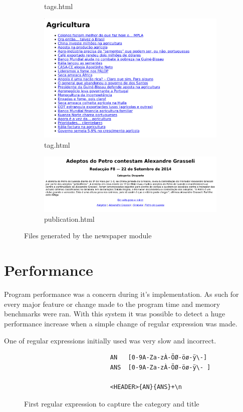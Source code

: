 \documentclass[a4paper]{article}
\begin{document}
\begin{figure}[H]
\begin{subfigure}{0.45\textwidth}
        \caption{tags.html}
    \end{subfigure}
    \begin{subfigure}{0.45\textwidth}
        \includegraphics[width=\textwidth]{./tag_print.png}
        \caption{tag.html}
    \end{subfigure}
    \begin{subfigure}{0.54\textwidth}
        \includegraphics[width=\textwidth]{./publication_print.png}
        \caption{publication.html}
    \end{subfigure}
    \caption{Files generated by the newspaper module}
\end{figure}

\section{Performance}

Program performance was a concern during it's implementation. As such for every
major feature or change made to the program time and memory benchmarks were
ran. With this system it was possible to detect a huge performance increase
when a simple change of regular expression was made.

One of regular expressions initially used was very slow and incorrect.
\begin{figure}[H]
    \centering
    \begin{verbatim}
                        AN   [0-9A-Za-zÀ-ÖØ-öø-ÿ\-]
                        ANS  [0-9A-Za-zÀ-ÖØ-öø-ÿ\- ]

                        <HEADER>{AN}{ANS}+\n
    \end{verbatim}
    \caption{First regular expression to capture the category and title}
\end{figure}
\end{document}
